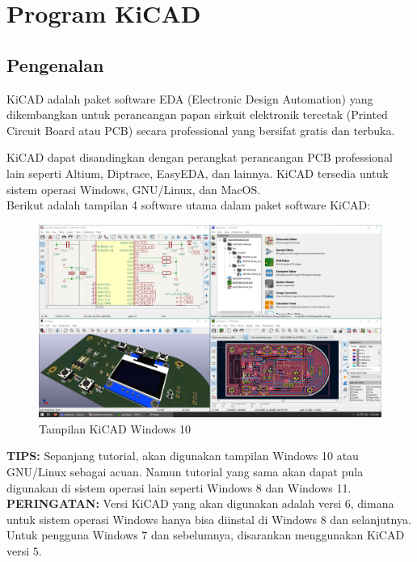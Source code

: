 \documentclass[12pt]{book}
\begin{document}

	\newpage
	\mainmatter
	\chapter{Program KiCAD}

	\section{Pengenalan}

	KiCAD adalah paket software EDA (Electronic Design Automation) yang dikembangkan untuk perancangan papan sirkuit elektronik tercetak (Printed Circuit Board atau PCB)
	secara professional yang bersifat gratis dan terbuka.

	KiCAD dapat disandingkan dengan perangkat perancangan PCB professional lain seperti Altium, Diptrace, EasyEDA, dan lainnya.
	KiCAD tersedia untuk sistem operasi Windows, GNU/Linux, dan MacOS.\\

	Berikut adalah tampilan 4 software utama dalam paket software KiCAD:
	\begin{figure}[!ht]
		\centering
		\includegraphics[width=\textwidth]{images/kicad_windows10}
		\caption{Tampilan KiCAD Windows 10}
	\end{figure}

	\textbf{TIPS:} Sepanjang tutorial, akan digunakan tampilan Windows 10 atau GNU/Linux sebagai acuan.
	Namun tutorial yang sama akan dapat pula digunakan di sistem operasi lain seperti Windows 8 dan Windows 11.\\

	\textbf{PERINGATAN:} Versi KiCAD yang akan digunakan adalah versi 6, dimana untuk sistem operasi Windows
	hanya bisa diinstal di Windows 8 dan selanjutnya.
	Untuk pengguna Windows 7 dan sebelumnya, disarankan menggunakan KiCAD versi 5.
\end{document}
